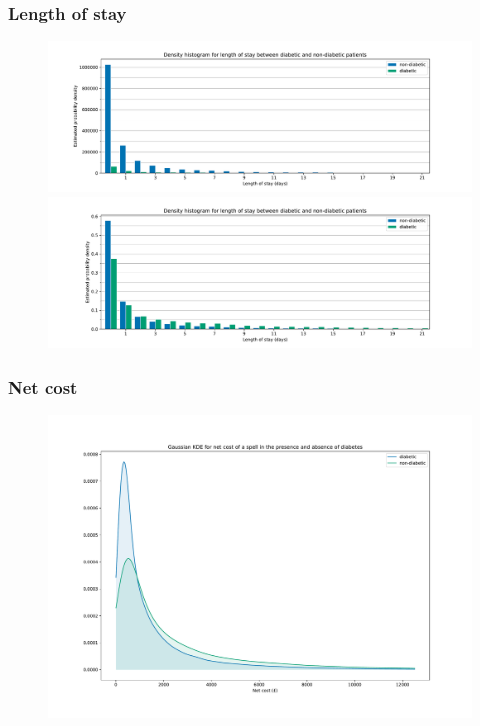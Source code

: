 \documentclass{beamer}
\begin{document}
\begin{frame}
    \frametitle{Length of stay}

    \begin{figure}
        \begin{minipage}{\linewidth}
            \includegraphics[width=\linewidth]{./img/diabetic_LOS_freq_hist.pdf}
        \end{minipage}
        \begin{minipage}{\linewidth}
            \includegraphics[width=\linewidth]
                {./img/diabetic_LOS_density_hist.pdf}
        \end{minipage}
    \end{figure}
\end{frame}

\begin{frame}
    \frametitle{Net cost}

    \begin{figure}
        \includegraphics[width=\linewidth]{./img/diabetic_netcost_kde.pdf}
    \end{figure}
\end{frame}
\end{document}
